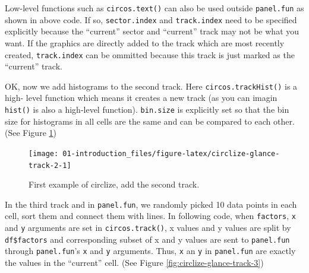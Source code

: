 \documentclass[]{book}
\newenvironment{Shaded}{\begin{snugshade}}{\end{snugshade}}
\newcommand{\KeywordTok}[1]{\textcolor[rgb]{0.13,0.29,0.53}{\textbf{#1}}}
\newcommand{\DataTypeTok}[1]{\textcolor[rgb]{0.13,0.29,0.53}{#1}}
\newcommand{\DecValTok}[1]{\textcolor[rgb]{0.00,0.00,0.81}{#1}}
\newcommand{\FloatTok}[1]{\textcolor[rgb]{0.00,0.00,0.81}{#1}}
\newcommand{\StringTok}[1]{\textcolor[rgb]{0.31,0.60,0.02}{#1}}
\newcommand{\OtherTok}[1]{\textcolor[rgb]{0.56,0.35,0.01}{#1}}
\newcommand{\OperatorTok}[1]{\textcolor[rgb]{0.81,0.36,0.00}{\textbf{#1}}}
\newcommand{\NormalTok}[1]{#1}
\theoremstyle{definition}
\theoremstyle{definition}
\theoremstyle{remark}
\begin{document}
Low-level functions such as \texttt{circos.text()} can also be used
outside \texttt{panel.fun} as shown in above code. If so,
\texttt{sector.index} and \texttt{track.index} need to be specified
explicitly because the ``current'' sector and ``current'' track may not
be what you want. If the graphics are directly added to the track which
are most recently created, \texttt{track.index} can be ommitted because
this track is just marked as the ``current'' track.

OK, now we add histograms to the second track. Here
\texttt{circos.trackHist()} is a high- level function which means it
creates a new track (as you can imagin \texttt{hist()} is also a
high-level function). \texttt{bin.size} is explicitly set so that the
bin size for histograms in all cells are the same and can be compared to
each other. (See Figure \ref{fig:circlize-glance-track-2})

\begin{Shaded}
\end{Shaded}

\begin{figure}

{\centering \texttt{[image: 01-introduction\_files/figure-latex/circlize-glance-track-2-1]} 

}

\caption{First example of circlize, add the second track.}\label{fig:circlize-glance-track-2}
\end{figure}

In the third track and in \texttt{panel.fun}, we randomly picked 10 data
points in each cell, sort them and connect them with lines. In following
code, when \texttt{factors}, \texttt{x} and \texttt{y} arguments are set
in \texttt{circos.track()}, x values and y values are split by
\texttt{df\$factors} and corresponding subset of x and y values are sent
to \texttt{panel.fun} through \texttt{panel.fun}'s \texttt{x} and
\texttt{y} arguments. Thus, \texttt{x} an \texttt{y} in
\texttt{panel.fun} are exactly the values in the ``current'' cell. (See
Figure \ref{fig:circlize-glance-track-3})
\end{document}
